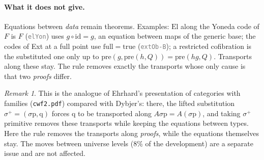 \documentclass[11pt]{article}
\newcommand{\seg}[1]{\textcolor{gray}{\texttt{\small #1}}}
\newcommand{\El}{\mathrm{El}}
\theoremstyle{remark}
\newtheorem*{remark}{Remark}
\begin{document}
\paragraph{What it does not give.}  Equations between \emph{data} remain
theorems.  Examples: $\El$ along the Yoneda code of $F$ is $F$
(\seg{elYon}) uses $g\circ\mathrm{id} = g$, an equation between maps of the
generic base; the codes of Ext at a full point use $\mathrm{full} = \mathrm{true}$
(\seg{extOb-B}); a restricted cofibration is the substituted one only up to
$\mathrm{pre}(g, \mathrm{pre}(h, Q)) = \mathrm{pre}(hg, Q)$.  Transports along
these stay.  The rule removes exactly the transports whose only cause is that
two \emph{proofs} differ.

\begin{remark}
This is the analogue of Ehrhard's presentation of categories with families
(\texttt{cwf2.pdf}) compared with Dybjer's: there, the lifted substitution
$\sigma^+ = (\sigma\mathrm{p}, \mathrm{q})$ forces $\mathrm{q}$ to be
transported along $A\sigma\mathrm{p} = A(\sigma\mathrm{p})$, and taking
$\sigma^+$ primitive removes these transports while keeping the equations
between types.  Here the rule removes the transports along \emph{proofs},
while the equations themselves stay.  The moves between universe levels
(8\% of the development) are a separate issue and are not affected.
\end{remark}
\end{document}
